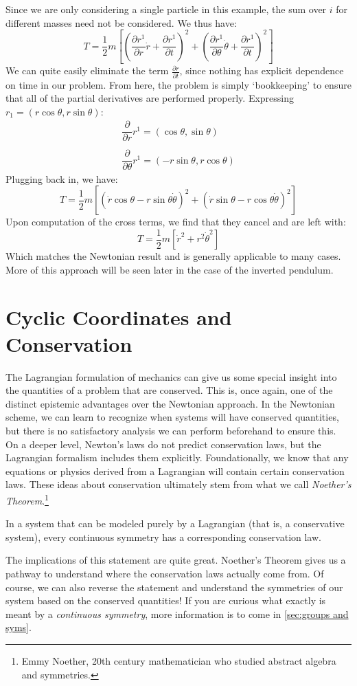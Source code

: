 Since we are only considering a single particle in this example, the sum over $i$ for different masses need not be considered. We thus have:
$$T=\frac{1}{2}m\left[\left(\frac{\partial r^1}{\partial r}\dot{r}+\frac{\partial r^1}{\partial t}\right)^2+\left(\frac{\partial r^1}{\partial \theta}\dot{\theta}+\frac{\partial r^1}{\partial t}\right)^2\right]$$
We can quite easily eliminate the term $\frac{\partial r}{\partial t}$, since nothing has explicit dependence on time in our problem. From here, the problem is simply `bookkeeping' to ensure that all of the partial derivatives are performed properly. Expressing $r_1 = (r\cos\theta,r\sin\theta)$:
$$\begin{array}{l}
\dfrac{\partial}{\partial r}r^1=(\cos\theta,\sin\theta)\\
\\
    \dfrac{\partial}{\partial \theta}r^1=(-r\sin\theta,r\cos\theta)
\end{array}$$
Plugging back in, we have:
$$T=\frac{1}{2}m\left[\left(\dot{r}\cos\theta-r\sin\theta\dot{\theta}\right)^2+\left(\dot{r}\sin\theta-r\cos\theta\dot{\theta}\right)^2\right]$$
Upon computation of the cross terms, we find that they cancel and are left with:
$$T=\frac{1}{2}m\left[\dot{r}^2+r^2\dot{\theta}^2\right]$$
Which matches the Newtonian result and is generally applicable to many cases. More of this approach will be seen later in the case of the inverted pendulum.


\section{Cyclic Coordinates and Conservation}
The \gls{Lagrangian} formulation of mechanics can give us some special insight into the quantities of a problem that are conserved. This is, once again, one of the distinct epistemic advantages over the Newtonian approach. In the Newtonian scheme, we can learn to recognize when systems will have conserved quantities, but there is no satisfactory analysis we can perform beforehand to ensure this. On a deeper level, Newton's laws do not predict conservation laws, but the \gls{Lagrangian} formalism includes them explicitly. Foundationally, we know that any equations or physics derived from a \gls{Lagrangian} will contain certain conservation laws. These ideas about conservation ultimately stem from what we call \textit{Noether's Theorem}.\footnote{Emmy Noether, 20th century mathematician who studied abstract algebra and symmetries.}

\begin{theorem}
In a system that can be modeled purely by a Lagrangian (that is, a conservative system), every continuous symmetry has a corresponding conservation law.
\end{theorem}
The implications of this statement are quite great. Noether's Theorem gives us a pathway to understand where the conservation laws actually come from. Of course, we can also reverse the statement and understand the symmetries of our system based on the conserved quantities! If you are curious what exactly is meant by a \textit{continuous symmetry}, more information is to come in \autoref{sec:groups and syms}.

